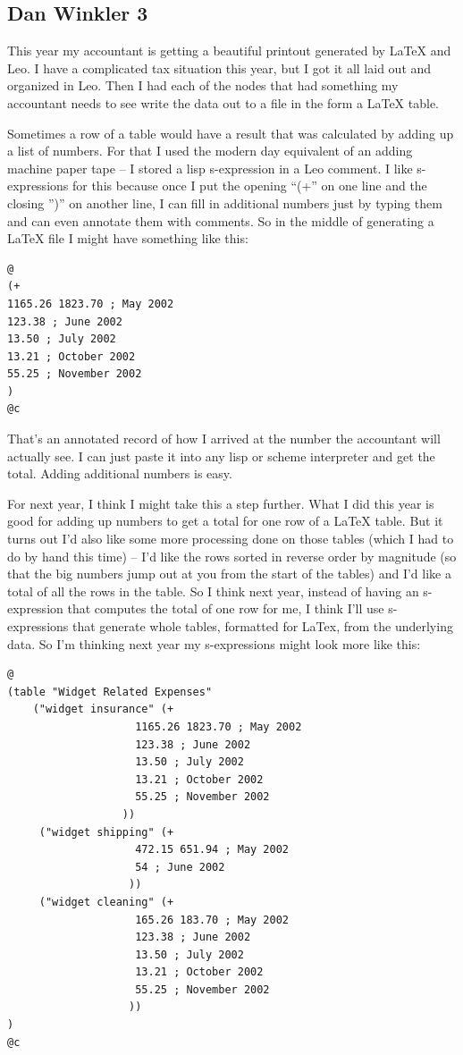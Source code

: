 \documentclass[a4paper,10pt,english]{sphinxmanual}
\begin{document}
\subsection{Dan Winkler 3}
\label{testimonials:dan-winkler-3}
This year my accountant is getting a beautiful printout generated by LaTeX and
Leo. I have a complicated tax situation this year, but I got it all laid out and
organized in Leo. Then I had each of the nodes that had something my accountant
needs to see write the data out to a file in the form a LaTeX table.

Sometimes a row of a table would have a result that was calculated by adding up
a list of numbers. For that I used the modern day equivalent of an adding
machine paper tape -- I stored a lisp s-expression in a Leo comment. I like
s-expressions for this because once I put the opening ``(+'' on one line and the
closing '')'' on another line, I can fill in additional numbers just by typing
them and can even annotate them with comments. So in the middle of generating a
LaTeX file I might have something like this:

\begin{Verbatim}[commandchars=\\\{\}]
@
(+
1165.26 1823.70 ; May 2002
123.38 ; June 2002
13.50 ; July 2002
13.21 ; October 2002
55.25 ; November 2002
)
@c
\end{Verbatim}

That's an annotated record of how I arrived at the number the accountant will
actually see. I can just paste it into any lisp or scheme interpreter and get
the total. Adding additional numbers is easy.

For next year, I think I might take this a step further. What I did this year is
good for adding up numbers to get a total for one row of a LaTeX table. But it
turns out I'd also like some more processing done on those tables (which I had
to do by hand this time) -- I'd like the rows sorted in reverse order by
magnitude (so that the big numbers jump out at you from the start of the tables)
and I'd like a total of all the rows in the table. So I think next year, instead
of having an s-expression that computes the total of one row for me, I think
I'll use s-expressions that generate whole tables, formatted for LaTex, from the
underlying data. So I'm thinking next year my s-expressions might look more like
this:

\begin{Verbatim}[commandchars=\\\{\}]
@
(table "Widget Related Expenses"
    ("widget insurance" (+
                    1165.26 1823.70 ; May 2002
                    123.38 ; June 2002
                    13.50 ; July 2002
                    13.21 ; October 2002
                    55.25 ; November 2002
                  ))
     ("widget shipping" (+
                    472.15 651.94 ; May 2002
                    54 ; June 2002
                   ))
     ("widget cleaning" (+
                    165.26 183.70 ; May 2002
                    123.38 ; June 2002
                    13.50 ; July 2002
                    13.21 ; October 2002
                    55.25 ; November 2002
                   ))
)
@c
\end{Verbatim}
\end{document}
